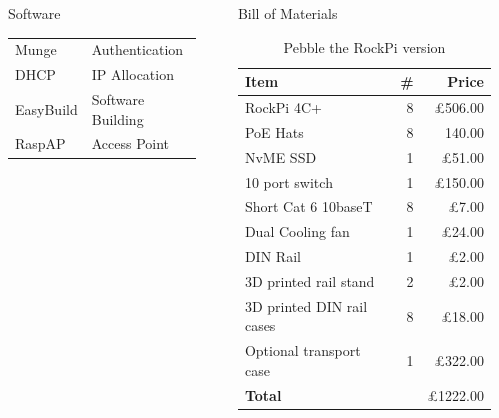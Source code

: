 \documentclass[final,20pt]{beamer}
\begin{document}
\begin{frame}[t]
\begin{columns}[t]
\begin{column}{0.3\paperwidth}
\begin{block}{Software}
\begin{table}
{\begin{tabular}{l|l}
								Munge & Authentication \\
								DHCP & IP Allocation \\
								EasyBuild & Software Building \\
								RaspAP & Access Point \\
							\end{tabular}
						}
					\end{table}
				\end{block}
			\end{column}
			\begin{column}{0.02\paperwidth}\end{column}
			\begin{column}{0.3\paperwidth}
				\begin{block}{Bill of Materials}
					\begin{table}
						\parbox{.7\linewidth}{
							\caption{Pebble the RockPi version}				
							\begin{tabular}{l|r|r}
								\textbf{Item} & \textbf{\#} & \textbf{Price} \\
								\hline
								RockPi 4C+ & 8 & £506.00\\
								PoE Hats & 8 & 140.00 \\
								NvME SSD & 1 & £51.00 \\
								10 port switch & 1 & £150.00 \\
								Short Cat 6 10baseT & 8 & £7.00\\
								Dual Cooling fan & 1 & £24.00 \\
								DIN Rail & 1 & £2.00 \\
								3D printed rail stand & 2 & £2.00 \\
								3D printed DIN rail cases & 8 & £18.00 \\
								Optional transport case & 1 & £322.00 \\
								\hline
								\textbf{Total} &  & £1222.00 \\
							\end{tabular}
						}
					\end{table}
				\end{block}
			\end{column}
			\begin{column}{0.02\paperwidth}\end{column}
		\end{columns}
	\end{frame}
	
\end{document}
